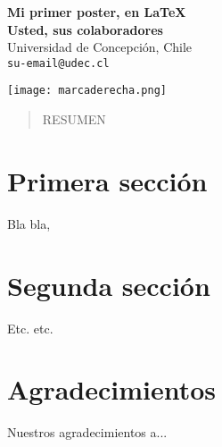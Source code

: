 \documentclass[a0,portrait]{a0poster}
\begin{document}
\begin{minipage}[b]{0.7\linewidth}
\veryHuge \color{NavyBlue} \textbf{Mi primer poster, en \LaTeX} \color{Black}\\ 
\huge \textbf{Usted, sus colaboradores}\\[0.2cm]
\large Universidad de Concepci\'on, Chile\\[0.2cm] 
\Large \texttt{su-email@udec.cl}
\end{minipage}
\begin{minipage}[b]{0.3\linewidth}
\texttt{[image: marcaderecha.png]}
\end{minipage}

\begin{multicols}{2} 
\color{Navy} %

\begin{abstract}
RESUMEN
\end{abstract}

\color{Black} 
\section{Primera sección}

Bla bla,

\section{Segunda sección}

Etc. etc.

\section*{Agradecimientos}

Nuestros agradecimientos a...


\end{multicols}
\end{document}
